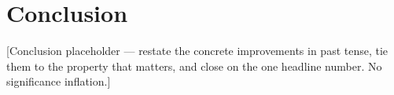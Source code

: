 \section{Conclusion}
\label{sec:conclusion}
[Conclusion placeholder — restate the concrete improvements in past tense, tie them to the property that
matters, and close on the one headline number. No significance inflation.]

